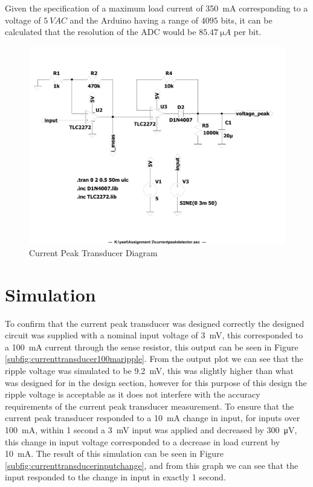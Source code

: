 Given the specification of a maximum load current of \SI{350}{\milli A} corresponding to a voltage of $\SI{5}{VAC}$ and the Arduino having a range of $4095$ bits, it can be calculated that the resolution of the ADC would be $\SI{85.47}{\micro A}$ per bit.
\begin{figure}[h!]
    \centering
    \includegraphics[width = 0.57\linewidth]{Figures/currentpeakdetector.pdf}
        \caption{Current Peak Transducer Diagram}
    \label{fig:currentpeakdetector.pdf}
\end{figure}

\section{Simulation} \label{sec:simulation_current_peak_transducer}
To confirm that the current peak transducer was designed correctly the designed circuit was supplied with a nominal input voltage of \SI{3}{\milli \volt}, this corresponded to a \SI{100}{\milli A} current through the sense resistor, this output can be seen in Figure \ref{subfig:currenttransducer100maripple}. From the output plot we can see that the ripple voltage was simulated to be \SI{9.2}{\milli \volt}, this was slightly higher than what was designed for in the design section, however for this purpose of this design the ripple voltage is acceptable as it does not interfere with the accuracy requirements of the current peak transducer measurement.\vspace{4mm} \newline 
To ensure that the current peak transducer responded to a \SI{10}{\milli A} change in input, for inputs over \SI{100}{\milli A}, within 1 second a \SI{3}{\milli \volt} input was applied and decreased by \SI{300}{\micro \volt}, this change in input voltage corresponded to a decrease in load current by \SI{10}{\milli A}. The result of this simulation can be seen in Figure \ref{subfig:currenttransducerinputchange}, and from this graph we can see that the input responded to the change in input in exactly 1 second. 

